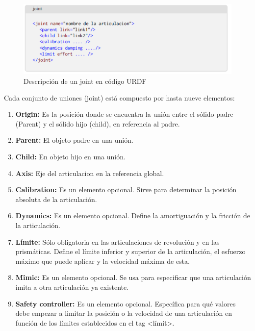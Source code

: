                                         \newpage

        
        \begin{figure}[htb]
            \centering
            \includegraphics[width=1.0\linewidth]{Main/Chapter3/Images3/3-8/codigo-joint.png}
            \caption{Descripción de un joint en código URDF}
            \label{f:Cap3-8_nose_nose}
        \end{figure} 
        
        Cada conjunto de uniones (joint) está compuesto por hasta nueve elementos:
        
         \begin{enumerate}      
            \item \textbf{Origin:} Es la posición donde se encuentra la unión entre el sólido padre (Parent) y el sólido hijo (child), en referencia al padre.
            \item \textbf{Parent:} El objeto padre en una unión.
            \item \textbf{Child:} En objeto hijo en una unión.
            \item \textbf{Axis:} Eje del articulacion en la referencia global.
            \item \textbf{Calibration:} Es un elemento opcional. Sirve para determinar la posición absoluta de la articulación.
            \item \textbf{Dynamics:} Es un elemento opcional. Define la amortiguación y la fricción de la articulación.
            \item \textbf{Límite:} Sólo obligatoria en las articulaciones de revolución y en las prismáticas. Define el límite inferior y superior de la articulación, el esfuerzo máximo que puede aplicar y la velocidad máxima de esta.
            \item \textbf{Mimic:} Es un elemento opcional. Se usa para especificar que una articulación imita a otra articulación ya existente. 
            \item \textbf{Safety controller:} Es un elemento opcional. Específica para qué valores debe empezar a limitar la posición o la velocidad de una articulación en función de los límites establecidos en el tag <límit>.
        \end{enumerate}
        
